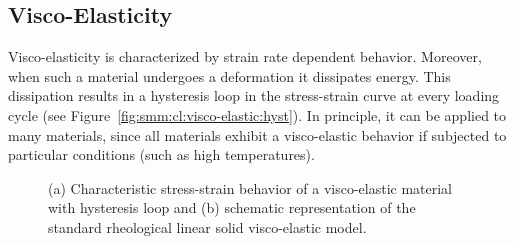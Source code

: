\subsection{Visco-Elasticity}

Visco-elasticity is characterized by strain rate dependent
behavior. Moreover, when such a material undergoes a deformation it
dissipates energy. This dissipation results in a hysteresis loop in
the stress-strain curve at every loading cycle (see
Figure~\ref{fig:smm:cl:visco-elastic:hyst}). In principle, it can be
applied to many materials, since all materials exhibit a visco-elastic
behavior if subjected to particular conditions (such as high
temperatures).
\begin{figure}[!htb]
  \begin{center}

    \hspace{0.05\textwidth}
    \caption{(a) Characteristic stress-strain behavior of a visco-elastic material with hysteresis loop and (b) schematic representation of the standard rheological linear solid visco-elastic model.}
    \label{fig:smm:cl:visco-elastic}
  \end{center}
\end{figure}
